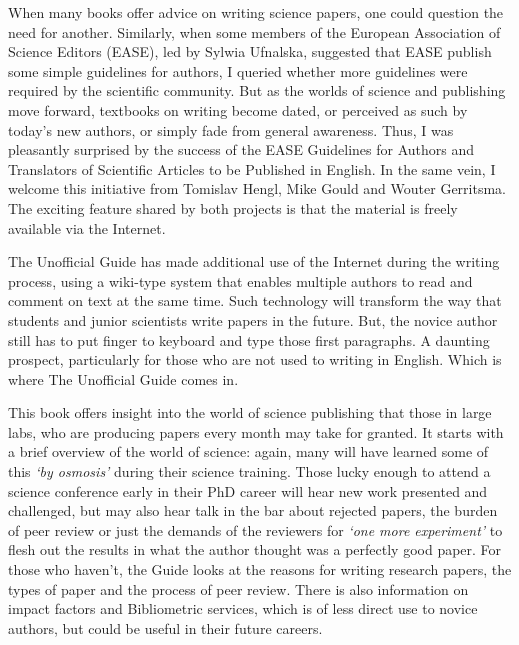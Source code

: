 \documentclass[graybox,envcountchap,sectrefs,UStrade]{svmono}
\begin{document}
\frontmatter%

%

\foreword

When many books offer advice on writing science papers, one could question the need for another. Similarly, when some members of the European Association of Science Editors (EASE), led by Sylwia Ufnalska, suggested that EASE publish some simple guidelines for authors, I queried whether more guidelines were required by the scientific community. But as the worlds of science and publishing move forward, textbooks on writing become dated, or perceived as such by today's new authors, or simply fade from general awareness. Thus, I was pleasantly surprised by the success of the EASE Guidelines for Authors and Translators of Scientific Articles to be Published in English. In the same vein, I welcome this initiative from Tomislav Hengl, Mike Gould and Wouter Gerritsma. The exciting feature shared by both projects is that the material is freely available via the Internet.\par

The Unofficial Guide has made additional use of the Internet during the writing process, using a wiki-type system that enables multiple authors to read and comment on text at the same time. Such technology will transform the way that students and junior scientists write papers in the future. But, the novice author still has to put finger to keyboard and type those first paragraphs. A daunting prospect, particularly for those who are not used to writing in English. Which is where The Unofficial Guide comes in.\par

This book offers insight into the world of science publishing that those in large labs, who are producing papers every month may take for granted. It starts with a brief overview of the world of science: again, many will have learned some of this \emph{`by osmosis'} during their science training. Those lucky enough to attend a science conference early in their PhD career will hear new work presented and challenged, but may also hear talk in the bar about rejected papers, the burden of peer review or just the demands of the reviewers for \emph{`one more experiment'} to flesh out the results in what the author thought was a perfectly good paper. For those who haven't, the Guide looks at the reasons for writing research papers, the types of paper and the process of peer review. There is also information on impact factors and Bibliometric services, which is of less direct use to novice authors, but could be useful in their future careers.\par
\end{document}
